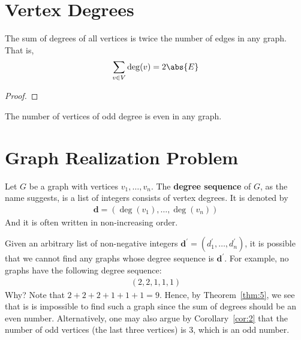 \documentclass[thmcnt=section, 12pt, color=cyan]{my-elegantbook}
\begin{document}

\section{Vertex Degrees}


\begin{theorem} \label{thm:5}
	The sum of degrees of all vertices
	is twice the number of edges in any graph.
	That is, 
	\begin{align*}
		\sum_{v \in V} \deg(v) = 2 \abs{E}
	\end{align*}
\end{theorem}

\begin{proof}
\end{proof}

\begin{corollary} \label{cor:2}
	The number of vertices of odd degree is even
	in any graph.
\end{corollary}


\section{Graph Realization Problem}


Let $G$ be a graph with vertices $v_1, \ldots, v_n$.
The \textbf{degree sequence} of $G$, 
as the name suggests,
is a list of integers consists of vertex degrees.
It is denoted by 
\begin{align*}
	\mathbf{d} = (\deg(v_1), \ldots, \deg(v_n))
\end{align*}
And it is often written in non-increasing order.

Given an arbitrary list of non-negative integers
$\mathbf{d}^\prime = (d_1^\prime, \ldots, d_n^\prime)$,
it is possible that 
we cannot find any graphs whose degree sequence
is $\mathbf{d}^\prime$.
For example, no graphs have the following degree sequence:
\begin{align*}
	(2, 2, 1, 1, 1)
\end{align*}
Why? Note that $2+2+2+1+1+1 = 9$.
Hence, by Theorem~\ref{thm:5}, we see that is is impossible to 
find such a graph since the sum of degrees should be an even number.
Alternatively, one may also argue by Corollary~\ref{cor:2}
that the number of odd vertices (the last three vertices)
is 3, which is an odd number.
\end{document}

